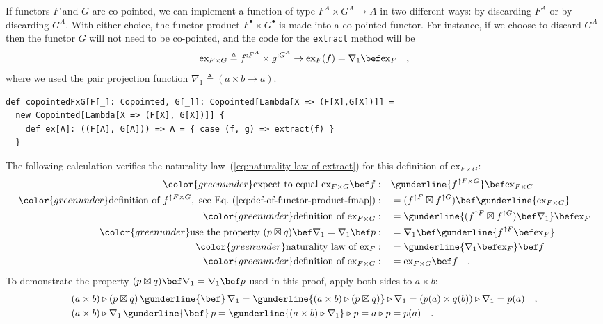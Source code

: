 If functors $F$ and $G$ are co-pointed, we can implement a function
of type $F^{A}\times G^{A}\rightarrow A$ in two different ways: by
discarding $F^{A}$ or by discarding $G^{A}$. With either choice,
the functor product $F^{\bullet}\times G^{\bullet}$ is made into
a co-pointed functor. For instance, if we choose to discard $G^{A}$
then the functor $G$ will not need to be co-pointed, and the code
for the \lstinline!extract! method will be 
\[
\text{ex}_{F\times G}\triangleq f^{:F^{A}}\times g^{:G^{A}}\rightarrow\text{ex}_{F}(f)=\nabla_{1}\bef\text{ex}_{F}\quad,
\]
where we used the pair projection function $\nabla_{1}\triangleq(a\times b\rightarrow a)$.
\begin{lstlisting}
def copointedFxG[F[_]: Copointed, G[_]]: Copointed[Lambda[X => (F[X],G[X])]] =
  new Copointed[Lambda[X => (F[X], G[X])]] {
    def ex[A]: ((F[A], G[A])) => A = { case (f, g) => extract(f) }
  }
\end{lstlisting}
The following calculation verifies the naturality law~(\ref{eq:naturality-law-of-extract})
for this definition of $\text{ex}_{F\times G}$:
\begin{align*}
{\color{greenunder}\text{expect to equal }\text{ex}_{F\times G}\bef f:}\quad & \gunderline{f^{\uparrow F\times G}}\bef\text{ex}_{F\times G}\\
{\color{greenunder}\text{definition of }f^{\uparrow F\times G},\text{ see Eq.~(\ref{eq:def-of-functor-product-fmap})}:}\quad & =(f^{\uparrow F}\boxtimes f^{\uparrow G})\bef\gunderline{\text{ex}_{F\times G}}\\
{\color{greenunder}\text{definition of }\text{ex}_{F\times G}:}\quad & =\gunderline{(f^{\uparrow F}\boxtimes f^{\uparrow G})\bef\nabla_{1}}\bef\text{ex}_{F}\\
{\color{greenunder}\text{use the property }(p\boxtimes q)\bef\nabla_{1}=\nabla_{1}\bef p:}\quad & =\nabla_{1}\bef\gunderline{f^{\uparrow F}\bef\text{ex}_{F}}\\
{\color{greenunder}\text{naturality law of }\text{ex}_{F}:}\quad & =\gunderline{\nabla_{1}\bef\text{ex}_{F}}\bef f\\
{\color{greenunder}\text{definition of }\text{ex}_{F\times G}:}\quad & =\text{ex}_{F\times G}\bef f\quad.
\end{align*}
To demonstrate the property $(p\boxtimes q)\bef\nabla_{1}=\nabla_{1}\bef p$
used in this proof, apply both sides to $a\times b$:
\begin{align*}
 & (a\times b)\triangleright(p\boxtimes q)\,\gunderline{\bef}\,\nabla_{1}=\gunderline{(a\times b)\triangleright(p\boxtimes q)}\triangleright\nabla_{1}=(p(a)\times q(b))\triangleright\nabla_{1}=p(a)\quad,\\
 & (a\times b)\triangleright\nabla_{1}\,\gunderline{\bef}\,p=\gunderline{(a\times b)\triangleright\nabla_{1}}\triangleright p=a\triangleright p=p(a)\quad.
\end{align*}


